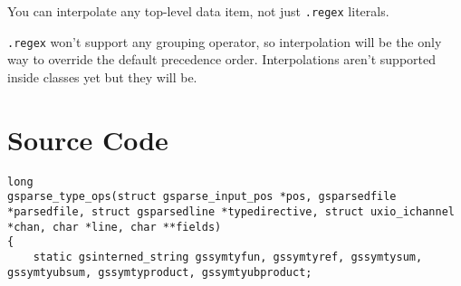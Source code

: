 \documentclass{report}
\newcommand\stringcode[1]{\texttt{#1}}
\begin{document}
You can interpolate any top-level data item, not just \stringcode{.regex} literals.

\stringcode{.regex} won't support any grouping operator,
so interpolation will be the only way to override the default precedence order.
Interpolations aren't supported inside classes yet but they will be.

\chapter{Source Code}

\begin{verbatim}
long
gsparse_type_ops(struct gsparse_input_pos *pos, gsparsedfile *parsedfile, struct gsparsedline *typedirective, struct uxio_ichannel *chan, char *line, char **fields)
{
    static gsinterned_string gssymtyfun, gssymtyref, gssymtysum, gssymtyubsum, gssymtyproduct, gssymtyubproduct;


\end{verbatim}
\end{document}

